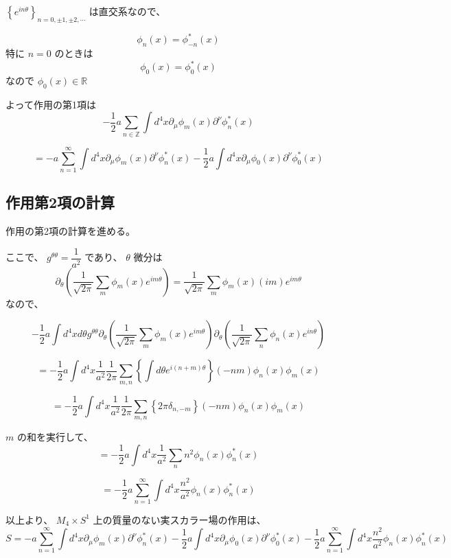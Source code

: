 \documentclass{article}
\begin{document}
$\left\{ e^{i n \theta} \right\}_{n=0,\pm 1, \pm 2 ,\cdots}$
は直交系なので、

$$
	\phi_{n}(x) = \phi^{*}_{-n}(x)
$$
特に
$n=0$
のときは
$$
	\phi_{0}(x) = \phi^{*}_{0}(x)
$$
なので
$
	\phi_{0}(x)
	\in \mathbb{R}
$

よって作用の第1項は
$$
	- \dfrac{1}{2}
	a
	\sum_{n \in \mathbb{Z}}
	\int d^{4} x
	\partial_{\mu}
	\phi_{m}(x)
	\partial^{\nu}
	\phi_{n}^{*}(x)
$$

$$
	=
	-a
	\sum_{n=1}^{\infty}
	\int d^{4} x
	\partial_{\mu}
	\phi_{m}(x)
	\partial^{\nu}
	\phi_{n}^{*}(x)
	- \dfrac{1}{2}
	a
	\int d^{4} x
	\partial_{\mu}
	\phi_{0}(x)
	\partial^{\nu}
	\phi_{0}^{*}(x)
$$

\subsection{作用第2項の計算}

作用の第2項の計算を進める。

ここで、
$ g^{\theta \theta} = \dfrac{1}{a^{2}}$
であり、
$\theta$
微分は
$$
	\partial_{\theta}
	\left(
	\dfrac{1}{\sqrt{ 2 \pi}}
	\sum_{m}
	\phi_{m}(x)
	e^{i m \theta}
	\right)
	=
	\dfrac{1}{\sqrt{ 2 \pi}}
	\sum_{m}
	\phi_{m}(x)
	(im)
	e^{i m \theta}
$$
なので、

$$
	- \dfrac{1}{2}
	a
	\int d^{4} x d \theta
	g^{\theta \theta}
	\partial_{\theta}
	\left(
	\dfrac{1}{\sqrt{ 2 \pi}}
	\sum_{m}
	\phi_{m}(x)
	e^{i m \theta}
	\right)
	\partial_{\theta}
	\left(
	\dfrac{1}{\sqrt{ 2 \pi}}
	\sum_{n}
	\phi_{n}(x)
	e^{i n \theta}
	\right)
$$

$$
	=
	- \dfrac{1}{2}
	a
	\int d^{4} x
	\dfrac{1}{a^{2}}
	\dfrac{1}{2 \pi}
	\sum_{m,n}
	\left\{
	\int d \theta
	e^{i (n+m) \theta}
	\right\}
	( - n m )
	\phi_{n}(x)
	\phi_{m}(x)
$$

$$
	=
	- \dfrac{1}{2}
	a
	\int d^{4} x
	\dfrac{1}{a^{2}}
	\dfrac{1}{2 \pi}
	\sum_{m,n}
	\left\{
	2 \pi
	\delta_{n,-m}
	\right\}
	( - n m )
	\phi_{n}(x)
	\phi_{m}(x)
$$

$m$
の和を実行して、
$$
	=
	- \dfrac{1}{2}
	a
	\int d^{4} x
	\dfrac{1}{a^{2}}
	\sum_{n}
	n^{2}
	\phi_{n}(x)
	\phi_{n}^{*}(x)
$$

$$
	=
	- \dfrac{1}{2}
	a
	\sum_{n=1}^{\infty}
	\int d^{4} x
	\dfrac{ n^{2} }{ a^{2} }
	\phi_{n}(x)
	\phi_{n}^{*}(x)
$$

以上より、
$M_{4} \times S^{1}$
上の質量のない実スカラー場の作用は、
$$
	S
	=
	-a
	\sum_{n=1}^{\infty}
	\int d^{4} x
	\partial_{\mu}
	\phi_{m}(x)
	\partial^{\nu}
	\phi_{n}^{*}(x)
	-
	\dfrac{1}{2}
	a
	\int d^{4} x
	\partial_{\mu}
	\phi_{0}(x)
	\partial^{\nu}
	\phi_{0}^{*}(x)
	- \dfrac{1}{2}
	a
	\sum_{n=1}^{\infty}
	\int d^{4} x
	\dfrac{ n^{2} }{ a^{2} }
	\phi_{n}(x)
	\phi_{n}^{*}(x)
$$
\end{document}
